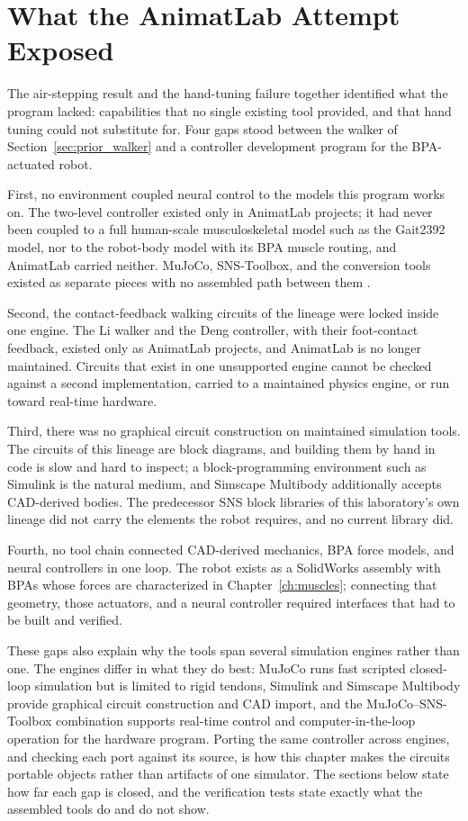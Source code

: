 \section{What the AnimatLab Attempt Exposed}\label{sec:sns_gaps}

The air-stepping result and the hand-tuning failure together identified what the program lacked: capabilities that no single existing tool provided, and that hand tuning could not substitute for. Four gaps stood between the walker of Section~\ref{sec:prior_walker} and a controller development program for the BPA-actuated robot.

First, no environment coupled neural control to the models this program works on. The two-level controller existed only in AnimatLab projects; it had never been coupled to a full human-scale musculoskeletal model such as the Gait2392 model, nor to the robot-body model with its BPA muscle routing, and AnimatLab carried neither. MuJoCo, SNS-Toolbox, and the conversion tools existed as separate pieces with no assembled path between them \citep{todorov_mujoco_2012, nourse_sns_2023}.

Second, the contact-feedback walking circuits of the lineage were locked inside one engine. The Li walker and the Deng controller, with their foot-contact feedback, existed only as AnimatLab projects, and AnimatLab is no longer maintained. Circuits that exist in one unsupported engine cannot be checked against a second implementation, carried to a maintained physics engine, or run toward real-time hardware.

Third, there was no graphical circuit construction on maintained simulation tools. The circuits of this lineage are block diagrams, and building them by hand in code is slow and hard to inspect; a block-programming environment such as Simulink is the natural medium, and Simscape Multibody additionally accepts CAD-derived bodies. The predecessor SNS block libraries of this laboratory's own lineage \citep{hunt_development_2017, young_analyzing_2019} did not carry the elements the robot requires, and no current library did.

Fourth, no tool chain connected CAD-derived mechanics, BPA force models, and neural controllers in one loop. The robot exists as a SolidWorks assembly with BPAs whose forces are characterized in Chapter~\ref{ch:muscles}; connecting that geometry, those actuators, and a neural controller required interfaces that had to be built and verified.

These gaps also explain why the tools span several simulation engines rather than one. The engines differ in what they do best: MuJoCo runs fast scripted closed-loop simulation but is limited to rigid tendons, Simulink and Simscape Multibody provide graphical circuit construction and CAD import, and the MuJoCo--SNS-Toolbox combination supports real-time control and computer-in-the-loop operation for the hardware program. Porting the same controller across engines, and checking each port against its source, is how this chapter makes the circuits portable objects rather than artifacts of one simulator. The sections below state how far each gap is closed, and the verification tests state exactly what the assembled tools do and do not show.


